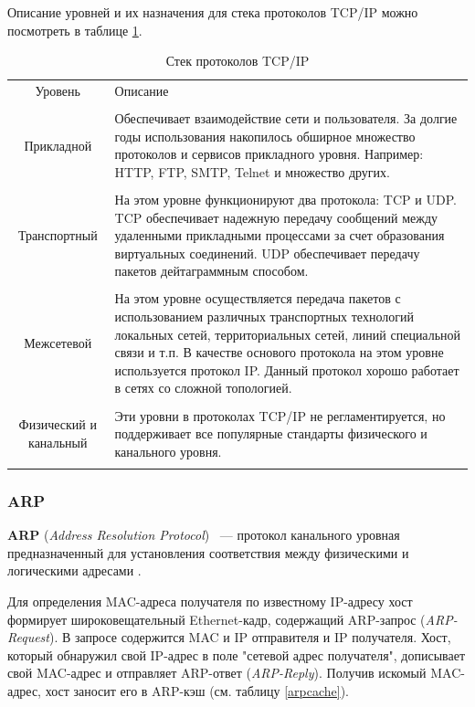 Описание уровней и их назначения для стека протоколов TCP/IP можно посмотреть в таблице \ref{tcpiptable}.

\begin{table}[h!]
\caption{Стек протоколов TCP/IP}
\label{tcpiptable}
	\begin{tabular}{|c| >{\centering} m{100mm} <{\centering}|}
	\hline
	Уровень & Описание \\
	\tabularnewline
	\hline
	Прикладной & Обеспечивает взаимодействие сети и пользователя. За долгие годы использования накопилось обширное множество протоколов и сервисов прикладного уровня. Например: HTTP, FTP, SMTP, Telnet и множество других.\\
	\tabularnewline
	\hline
	Транспортный & На этом уровне функционируют два протокола: TCP и UDP. TCP обеспечивает надежную передачу сообщений между удаленными прикладными процессами за счет образования виртуальных соединений. UDP обеспечивает передачу пакетов дейтаграммным способом.\\
	\tabularnewline
	\hline
	Межсетевой & На этом уровне осуществляется передача пакетов с использованием различных транспортных технологий локальных сетей, территориальных сетей, линий специальной связи и т.п. В качестве основого протокола на этом уровне используется протокол IP. Данный протокол хорошо работает в сетях со сложной топологией.\\
	\tabularnewline
	\hline
	Физический и канальный & Эти уровни в протоколах TCP/IP не регламентируется, но поддерживает все популярные стандарты физического и канального уровня.\\
	\tabularnewline
	\hline
	\end{tabular}
\end{table}

\iffalse

\subsubsection{ARP}

\textbf{ARP} (\textit{Address Resolution Protocol}) ~--- протокол канального уровная предназначенный для установления соответствия между физическими и логическими адресами \cite{arp}.

Для определения MAC-адреса получателя по известному IP-адресу хост формирует широковещательный Ethernet-кадр, содержащий ARP-запрос (\textit{ARP-Request}). В запросе содержится MAC и IP отправителя и IP получателя. Хост, который обнаружил свой IP-адрес в поле "сетевой адрес получателя", дописывает свой MAC-адрес и отправляет ARP-ответ (\textit{ARP-Reply}). Получив искомый MAC-адрес, хост заносит его в ARP-кэш (см. таблицу \ref{arpcache}). 

